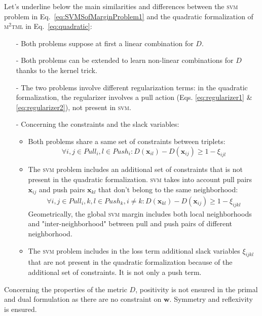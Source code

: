 \noindent Let's underline below the main similarities and differences between the \textsc{svm} problem in Eq.~\ref{eq:SVMSofMarginProblem1} and the quadratic formalization of \textsc{m$^2$tml} in Eq.~\ref{eq:quadratic}:
\begin{itemize}
	\item[-] Both problems suppose at first a linear combination for $D$.
	\item[-] Both problems can be extended to learn non-linear combinations for $D$ thanks to the kernel trick.
	\item[-] The two problems involve different regularization terms: in the quadratic formalization, the regularizer involves a pull action (Eqs. \ref{eq:regularizer1} \& \ref{eq:regularizer2}), not present in \textsc{svm}. 
	\item[-] Concerning the constraints and the slack variables:
	\begin{itemize}
		\item Both problems share a same set of constraints between triplets:
		\begin{equation*}
			\forall i,j \in Pull_i,l \in Push_i:
			D(\textbf{x}_{il})-D(\textbf{x}_{ij}) \geq 1-\xi_{ijl}
		\end{equation*}
		\item The \textsc{svm} problem includes an additional set of constraints that is not present in the quadratic formalization. \textsc{svm} takes into account pull pairs $\textbf{x}_{ij}$ and push pairs $\textbf{x}_{kl}$ that don't belong to the same neighborhood:
		\begin{align*}
			\forall i,j \in Pull_i,k,l \in Push_k, i \neq k: 
			D(\textbf{x}_{kl})-D(\textbf{x}_{ij}) \geq 1-\xi_{ijkl}	
		\end{align*}
		Geometrically, the global \textsc{svm} margin includes both local neighborhoods and "inter-neighborhood" between pull and push pairs of different neighborhood.
		\item The \textsc{svm} problem includes in the loss term additional slack variables $\xi_{ijkl}$ that are not present in the quadratic formalization because of the additional set of constraints. It is not only a push term.
	\end{itemize}
\end{itemize}

Concerning the properties of the metric $D$, positivity is not ensured in the primal and dual formulation as there are no constraint on $\textbf{w}$.
Symmetry and reflexivity is ensured.

